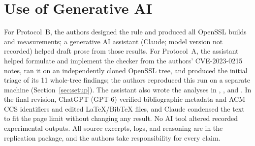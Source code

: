 \section*{Use of Generative AI}
For Protocol~B, the authors designed the rule and produced all OpenSSL
builds and measurements; a generative AI assistant (Claude; model version
not recorded) helped draft prose from those results. For Protocol~A, the
assistant helped formulate and implement the checker from the authors'
CVE-2023-0215 notes, ran it on an independently cloned OpenSSL tree, and
produced the initial triage of its 11 whole-tree findings; the authors
reproduced this run on a separate machine (Section~\ref{sec:setup}). The
assistant also wrote the analyses in
,
, and
. In the final revision,
ChatGPT (GPT-6) verified bibliographic metadata and ACM CCS identifiers and
edited LaTeX/BibTeX files, and Claude condensed the text to fit the page
limit without changing any result. No AI tool altered recorded
experimental outputs. All source excerpts, logs, and reasoning are in the
replication package, and the authors take responsibility for every claim.
